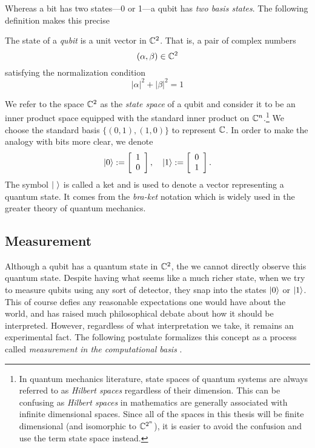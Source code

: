         Whereas a bit has two states---0 or 1---a qubit has \emph{two basis states}. The following definition makes 
        this precise
        \begin{definition}
            The state of a \emph{qubit} is a unit vector in $\mathbb{C}^2$. That is, a pair of complex numbers
            \[
                (\alpha, \beta) \in \mathbb{C}^2
            \]
            satisfying the normalization condition %
            \[
                |\alpha|^2 + |\beta|^2 = 1
            \]
        \end{definition}
        
        We refer to the space $\mathbb{C}^2$ as the \emph{state space} of a qubit and consider it to be an inner product 
        space equipped with the standard inner product on $\mathbb{C}^n$.\footnote{In quantum mechanics literature, state 
            spaces of quantum systems are always referred to as \emph{Hilbert spaces} regardless of their 
            dimension. This can be confusing as \emph{Hilbert spaces} in mathematics are generally associated with 
        infinite dimensional spaces. Since all of the spaces in this thesis will be finite dimensional (and 
    isomorphic to $\mathbb{C}^{2^n}$), it is easier to avoid the confusion and use the term state space instead.}
    We choose the standard basis $\{(0,1), (1,0)\}$ to represent $\mathbb{C}$. In order to make the analogy with bits more 
    clear, we denote \[
            \ket{0} := \left[\begin{array}{r}1\\0\end{array}\right], \quad
            \ket{1} := \left[\begin{array}{r}0\\1\end{array}\right].
         \] The symbol $\ket{\ }$ is called a ket and is used to denote a vector representing a quantum state. It 
         comes from the \emph{bra-ket} notation which is widely used in the greater theory of quantum mechanics.
        
        
         \subsection{Measurement} 
         
         Although a qubit has a quantum state in $\mathbb{C}^2$, the we cannot directly observe this quantum state. Despite 
         having what seems like a much richer state, when we try to measure qubits using any sort of detector, they 
         snap into the states $\ket{0}$ or $\ket{1}$. This of course defies any reasonable expectations one would 
         have about the world, and has raised much philosophical debate about how it should be interpreted. 
         However, regardless of what interpretation we take, it remains an experimental fact. The following 
         postulate formalizes this concept as a process called \emph{measurement in the computational basis} .

